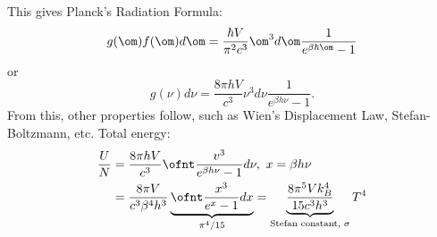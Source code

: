 \documentclass[a4paper, 11pt, normalem]{report}
\begin{document}
This gives Planck's Radiation Formula:
\begin{equation}
    g(\om)f(\om)d\om = \frac{\hbar V}{\pi^2c^3} \om^3 d\om \frac{1}{e^{\beta\hbar\om}-1}
\end{equation}
or
\begin{equation}
    g(\nu)d\nu = \frac{8\pi hV}{c^3}\nu^3d\nu \frac{1}{e^{\beta h\nu}-1}.
\end{equation}
From this, other properties follow, such as Wien's Displacement Law, Stefan-Boltzmann, etc.
Total energy:
\begin{align}
    \frac{U}{N} &= \frac{8\pi hV}{c^3} \ofnt \frac{v^3}{e^{\beta h\nu}-1}d\nu,~ x = \beta h\nu \\
                &= \frac{8\pi V}{c^3\beta^4h^3} \underbrace{\ofnt \frac{x^3}{e^x - 1}dx}_{\pi^4/15} = \underbrace{\frac{8\pi^5Vk_B^4}{15c^3h^3}}_{\text{Stefan constant, }\sigma}T^4
\end{align}
\end{document}
